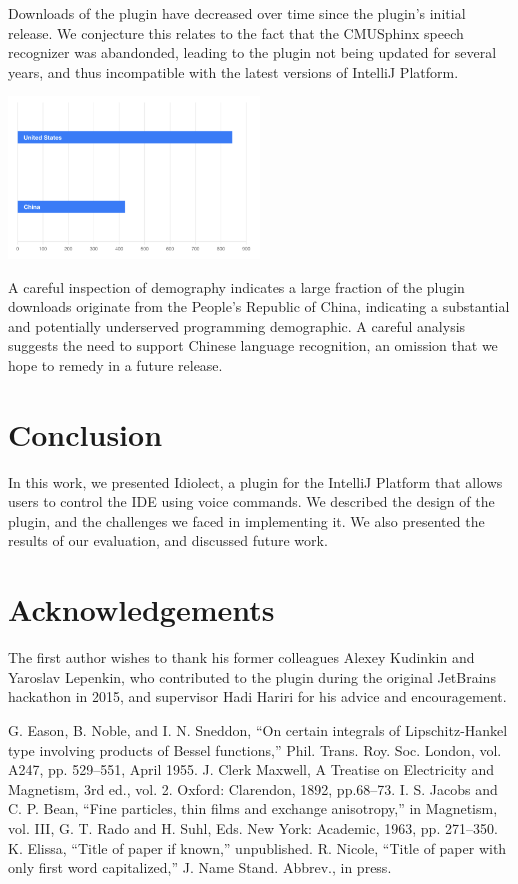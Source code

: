 \documentclass[conference]{IEEEtran}
\begin{document}
Downloads of the plugin have decreased over time since the plugin's initial release. We conjecture this relates to the fact that the CMUSphinx speech recognizer was abandonded, leading to the plugin not being updated for several years, and thus incompatible with the latest versions of IntelliJ Platform.

\includegraphics[width=0.50\textwidth]{demographics.png}

A careful inspection of demography indicates a large fraction of the plugin downloads originate from the People's Republic of China, indicating a substantial and potentially underserved programming demographic. A careful analysis suggests the need to support Chinese language recognition, an omission that we hope to remedy in a future release.

\section{Conclusion}

In this work, we presented Idiolect, a plugin for the IntelliJ Platform that allows users to control the IDE using voice commands. We described the design of the plugin, and the challenges we faced in implementing it. We also presented the results of our evaluation, and discussed future work.

\section{Acknowledgements}

The first author wishes to thank his former colleagues Alexey Kudinkin and Yaroslav Lepenkin, who contributed to the plugin during the original JetBrains hackathon in 2015, and supervisor Hadi Hariri for his advice and encouragement.

\begin{thebibliography}{00}
 G. Eason, B. Noble, and I. N. Sneddon, ``On certain integrals of Lipschitz-Hankel type involving products of Bessel functions,'' Phil. Trans. Roy. Soc. London, vol. A247, pp. 529--551, April 1955.
 J. Clerk Maxwell, A Treatise on Electricity and Magnetism, 3rd ed., vol. 2. Oxford: Clarendon, 1892, pp.68--73.
 I. S. Jacobs and C. P. Bean, ``Fine particles, thin films and exchange anisotropy,'' in Magnetism, vol. III, G. T. Rado and H. Suhl, Eds. New York: Academic, 1963, pp. 271--350.
 K. Elissa, ``Title of paper if known,'' unpublished.
 R. Nicole, ``Title of paper with only first word capitalized,'' J. Name Stand. Abbrev., in press.
\end{thebibliography}
\end{document}
